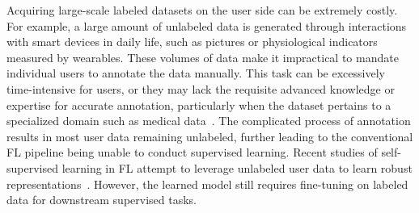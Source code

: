\documentclass[withindex,glossary]{cam-thesis}
\begin{document}
Acquiring large-scale labeled datasets on the user side can be extremely costly. For example, a large amount of unlabeled data is generated through interactions with smart devices in daily life, such as pictures or physiological indicators measured by wearables. These volumes of data make it impractical to mandate individual users to annotate the data manually. This task can be excessively time-intensive for users, or they may lack the requisite advanced knowledge or expertise for accurate annotation, particularly when the dataset pertains to a specialized domain such as medical data~\citep{yang2021federated}. The complicated process of annotation results in most user data remaining unlabeled, further leading to the conventional FL pipeline being unable to conduct supervised learning.
Recent studies of self-supervised learning in FL attempt to leverage unlabeled user data to learn robust representations~\citep{gao2022federated,rehman2022federated,rehman2023dawa}. However, the learned model still requires fine-tuning on labeled data for downstream supervised tasks.

\end{document}
